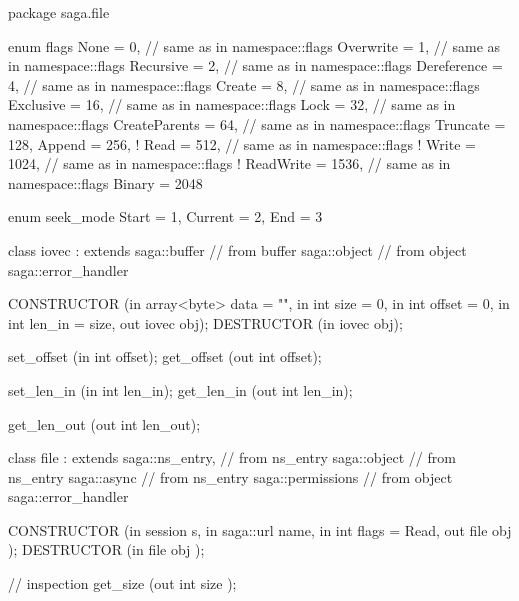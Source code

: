  \begin{myspec}
  package saga.file 
  { 
    enum flags 
    { 
      None           =    0, // same as in namespace::flags 
      Overwrite      =    1, // same as in namespace::flags
      Recursive      =    2, // same as in namespace::flags 
      Dereference    =    4, // same as in namespace::flags 
      Create         =    8, // same as in namespace::flags 
      Exclusive      =   16, // same as in namespace::flags
      Lock           =   32, // same as in namespace::flags 
      CreateParents  =   64, // same as in namespace::flags 
      Truncate       =  128, 
      Append         =  256, 
!     Read           =  512, // same as in namespace::flags 
!     Write          = 1024, // same as in namespace::flags 
!     ReadWrite      = 1536, // same as in namespace::flags 
      Binary         = 2048 
    }
 
 
    enum seek_mode
    {
      Start      =   1,
      Current    =   2,
      End        =   3
    }
 
 
    class iovec : extends saga::buffer
               // from buffer saga::object
               // from object saga::error_handler
    {
      CONSTRUCTOR (in array<byte>          data   = "",
                   in    int               size   = 0,
                   in    int               offset = 0,
                   in    int               len_in = size,
                   out   iovec             obj);
      DESTRUCTOR  (in    iovec             obj);
 
      set_offset  (in    int               offset);
      get_offset  (out   int               offset);
 
      set_len_in  (in    int               len_in);
      get_len_in  (out   int               len_in);
 
      get_len_out (out   int               len_out);
    }
 
    class file : extends        saga::ns_entry,
              // from ns_entry  saga::object
              // from ns_entry  saga::async
              // from ns_entry  saga::permissions
              // from object    saga::error_handler
    {
      CONSTRUCTOR (in    session           s,
                   in    saga::url         name,
                   in    int               flags = Read,
                   out   file              obj      );
      DESTRUCTOR  (in    file              obj      );
 
      // inspection
      get_size    (out   int               size     );
 
}}
\end{myspec}
